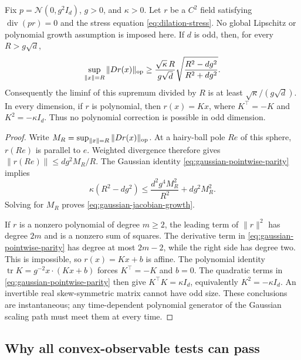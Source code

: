 \begin{proposition}
\label{prop:gaussian-escape-rigidity}
Fix $p=\mathcal N(0,g^2I_d)$, $g>0$, and $\kappa>0$.  Let $r$ be a
$C^2$ field satisfying $\operatorname{div}(pr)=0$ and the stress equation
\eqref{eq:dilation-stress}.  No global Lipschitz or polynomial growth
assumption is imposed here.  If $d$ is odd, then, for every $R>g\sqrt d$,
\begin{equation}
 \sup_{\|x\|=R}\|Dr(x)\|_{\rm op}
 \ge \frac{\sqrt\kappa\,R}{g\sqrt d}
       \sqrt{\frac{R^2-dg^2}{R^2+dg^2}}.
 \label{eq:gaussian-jacobian-growth}
\end{equation}
Consequently the liminf of this supremum divided by $R$ is at least
$\sqrt\kappa/(g\sqrt d)$.  In every dimension, if $r$ is polynomial,
then $r(x)=Kx$, where $K^\top=-K$ and $K^2=-\kappa I_d$.
Thus no polynomial correction is possible in odd dimension.
\end{proposition}

\begin{proof}
Write $M_R=\sup_{\|x\|=R}\|Dr(x)\|_{\rm op}$.  At a hairy-ball pole
$Re$ of this sphere, $r(Re)$ is parallel to $e$.  Weighted divergence
therefore gives $\|r(Re)\|\le dg^2M_R/R$.  The Gaussian identity
\eqref{eq:gaussian-pointwise-parity} implies
\[
 \kappa(R^2-dg^2)
 \le\frac{d^2g^4M_R^2}{R^2}+dg^2M_R^2.
\]
Solving for $M_R$ proves \eqref{eq:gaussian-jacobian-growth}.

If $r$ is a nonzero polynomial of degree $m\ge2$, the leading term of
$\|r\|^2$ has degree $2m$ and is a nonzero sum of squares.  The
derivative term in \eqref{eq:gaussian-pointwise-parity} has degree at
most $2m-2$, while the right side has degree two.  This is impossible,
so $r(x)=Kx+b$ is affine.  The polynomial identity
$\operatorname{tr}K=g^{-2}x\cdot(Kx+b)$ forces $K^\top=-K$ and $b=0$.
The quadratic terms in \eqref{eq:gaussian-pointwise-parity} then give
$K^\top K=\kappa I_d$, equivalently $K^2=-\kappa I_d$.  An invertible
real skew-symmetric matrix cannot have odd size.  These conclusions
are instantaneous; any time-dependent polynomial generator of the
Gaussian scaling path must meet them at every time.
\end{proof}

\subsection{Why all convex-observable tests can pass}


